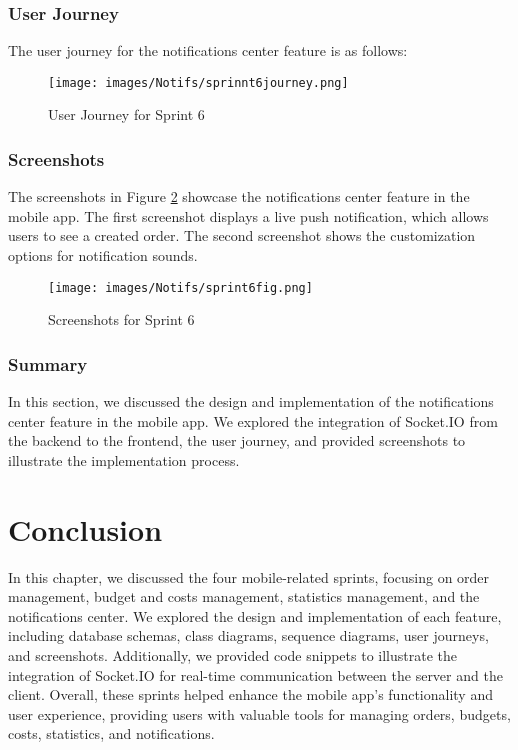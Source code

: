 \subsubsection{User Journey}

The user journey for the notifications center feature is as follows:

\begin{figure}[H]
    \centering
    \texttt{[image: images/Notifs/sprinnt6journey.png]}
    \caption{User Journey for Sprint 6}
    \label{fig:activity_sprint6}
\end{figure}

\subsubsection{Screenshots}

The screenshots in Figure \ref{fig:screenshots_sprint6} showcase the notifications center feature in the mobile app. The first screenshot displays a live push notification, which allows users to see a created order. The second screenshot shows the customization options for notification sounds.

\begin{figure}[H]
    \centering
    \texttt{[image: images/Notifs/sprint6fig.png]}
    \caption{Screenshots for Sprint 6}
    \label{fig:screenshots_sprint6}
\end{figure}

\subsubsection{Summary}

In this section, we discussed the design and implementation of the notifications center feature in the mobile app. We explored the integration of Socket.IO from the backend to the frontend, the user journey, and provided screenshots to illustrate the implementation process.

\section{Conclusion}

In this chapter, we discussed the four mobile-related sprints, focusing on order management, budget and costs management, statistics management, and the notifications center. We explored the design and implementation of each feature, including database schemas, class diagrams, sequence diagrams, user journeys, and screenshots. Additionally, we provided code snippets to illustrate the integration of Socket.IO for real-time communication between the server and the client. Overall, these sprints helped enhance the mobile app's functionality and user experience, providing users with valuable tools for managing orders, budgets, costs, statistics, and notifications.